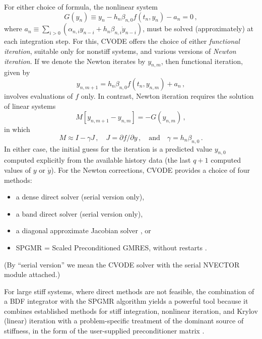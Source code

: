 For either choice of formula, the nonlinear system
\begin{equation}\label{NLS}
  G(y_n) \equiv y_n - h_n \beta_{n,0} f(t_n,y_n) - a_n = 0 \, ,
\end{equation}
where $a_n\equiv\sum_{i>0}(\alpha_{n,i}y_{n-i}+h_n\beta_{n,i}\dot{y}_{n-i})$, 
must be solved (approximately) at each integration step.  For this, CVODE
offers the choice of either {\em functional iteration}, suitable only
for nonstiff systems, and various versions of {\em Newton iteration}.
If we denote the Newton iterates by $y_{n,m}$, then functional iteration,
given by
\[ y_{n,m+1} = h_n \beta_{n,0} f(t_n,y_{n,m}) + a_n \, , \]
involves evaluations of $f$ only.  In contrast, Newton iteration requires
the solution of linear systems
\begin{equation*}
  M [y_{n,m+1} - y_{n,m}] = -G(y_{n,m}) \, ,
\end{equation*}
in which
\begin{equation}\label{Newtonmat} 
  M \approx I - \gamma J \, ,
  \quad J = \partial f / \partial y \, ,
  \quad \mbox{and} \quad
  \gamma = h_n \beta_{n,0} \, . 
\end{equation}
In either case, the initial guess for the iteration is a predicted
value $y_{n,0}$ computed explicitly from the available history data
(the last $q+1$ computed values of $y$ or $\dot{y}$).
For the Newton corrections, CVODE provides a choice of four methods:
\begin{itemize}
\item a dense direct solver (serial version only),
\item a band direct solver (serial version only),
\item a diagonal approximate Jacobian solver \cite{RaHi:93}, or
\item SPGMR = Scaled Preconditioned GMRES, without restarts
\cite{BrHi:89}.
\end{itemize}
(By ``serial version'' we mean the CVODE solver with the serial
NVECTOR module attached.)

For large stiff systems, where direct methods are not feasible, the
combination of a BDF integrator with the SPGMR algorithm
yields a powerful tool because it combines established methods for
stiff integration, nonlinear iteration, and Krylov (linear) iteration
with a problem-specific treatment of the dominant source of stiffness,
in the form of the user-supplied preconditioner matrix \cite{BrHi:89}.


